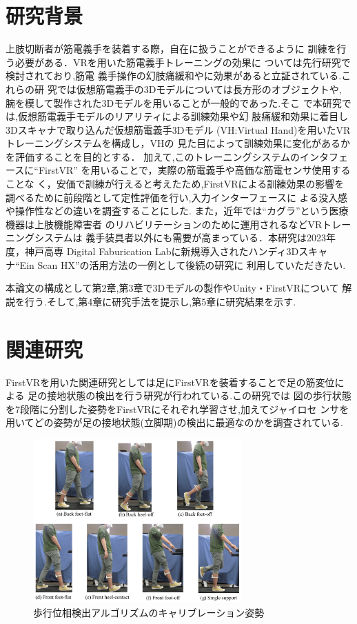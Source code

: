 \documentclass{ltjsreport}
\begin{document}
	\section{研究背景}
	上肢切断者が筋電義手を装着する際，自在に扱うことができるように
	訓練を行う必要がある．VRを用いた筋電義手トレーニングの効果に
	ついては先行研究\cite{ref:1}\cite{ref:2}で検討されており,筋電
	義手操作の幻肢痛緩和やに効果があると立証されている.これらの研
	究では仮想筋電義手の3Dモデルについては長方形のオブジェクトや,
	腕を模して製作された3Dモデルを用いることが一般的であった.そこ
	で本研究では,仮想筋電義手モデルのリアリティによる訓練効果や幻
	肢痛緩和効果に着目し3Dスキャナで取り込んだ仮想筋電義手3Dモデル
	(VH:Virtual Hand)を用いたVRトレーニングシステムを構成し，VHの
	見た目によって訓練効果に変化があるかを評価することを目的とする．
	加えて,このトレーニングシステムのインタフェースに``FirstVR''
	を用いることで，実際の筋電義手や高価な筋電センサ使用することな
	く，安価で訓練が行えると考えたため,FirstVRによる訓練効果の影響を
	調べるために前段階として定性評価を行い,入力インターフェースに
	よる没入感や操作性などの違いを調査することにした.
	また，近年では``カグラ''\cite{ref:3}という医療機器は上肢機能障害者
	のリハビリテーションのために運用されるなどVRトレーニングシステムは
	義手装具者以外にも需要が高まっている．本研究は2023年度，神戸高専
	Digital Faburication Labに新規導入されたハンディ3Dスキャナ``Ein Scan HX''\cite{ref:4}の活用方法の一例として後続の研究に
	利用していただきたい.

	本論文の構成として第2章,第3章で3Dモデルの製作やUnity・FirstVRについて
	解説を行う.そして,第4章に研究手法を提示し,第5章に研究結果を示す.
	
\clearpage
	\section{関連研究}
		FirstVRを用いた関連研究としては足にFirstVRを装着することで足の筋変位による
		足の接地状態の検出を行う研究\cite{ref:5}が行われている.この研究では
		図の歩行状態を7段階に分割した姿勢をFirstVRにそれぞれ学習させ,加えてジャイロセ
		ンサを用いてどの姿勢が足の接地状態(立脚期)の検出に最適なのかを調査されている.
		\begin{figure}[H]
		\centering
		\includegraphics[width = 8cm]{../figs/sensors-21-01081-g004.jpg}
		\caption{歩行位相検出アルゴリズムのキャリブレーション姿勢}
		\label{fig:RR-FVRcalibration}
		\end{figure}
		
\end{document}
